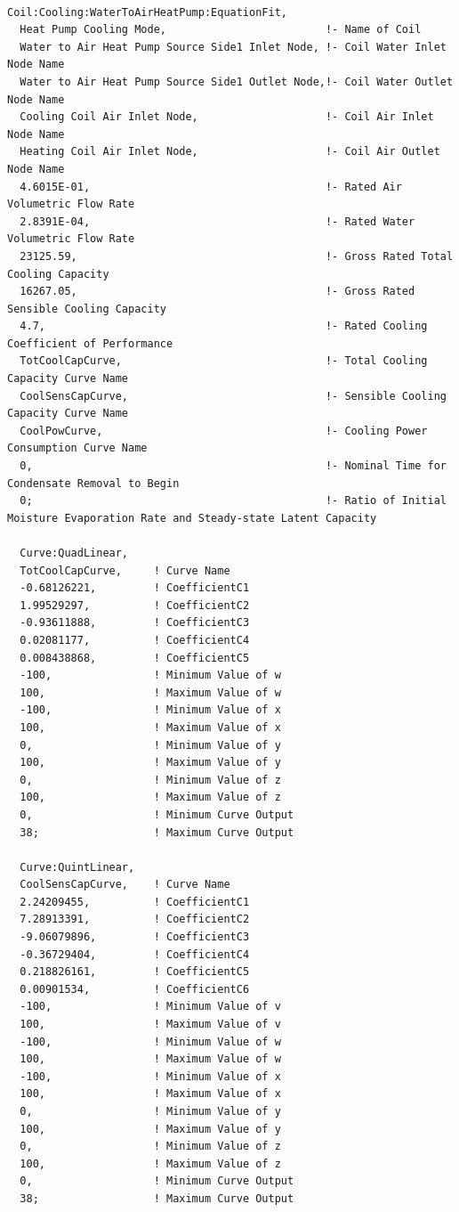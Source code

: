 \begin{lstlisting}

Coil:Cooling:WaterToAirHeatPump:EquationFit,
  Heat Pump Cooling Mode,                         !- Name of Coil
  Water to Air Heat Pump Source Side1 Inlet Node, !- Coil Water Inlet Node Name
  Water to Air Heat Pump Source Side1 Outlet Node,!- Coil Water Outlet Node Name
  Cooling Coil Air Inlet Node,                    !- Coil Air Inlet Node Name
  Heating Coil Air Inlet Node,                    !- Coil Air Outlet Node Name
  4.6015E-01,                                     !- Rated Air Volumetric Flow Rate
  2.8391E-04,                                     !- Rated Water Volumetric Flow Rate
  23125.59,                                       !- Gross Rated Total Cooling Capacity
  16267.05,                                       !- Gross Rated Sensible Cooling Capacity
  4.7,                                            !- Rated Cooling Coefficient of Performance
  TotCoolCapCurve,                                !- Total Cooling Capacity Curve Name
  CoolSensCapCurve,                               !- Sensible Cooling Capacity Curve Name
  CoolPowCurve,                                   !- Cooling Power Consumption Curve Name
  0,                                              !- Nominal Time for Condensate Removal to Begin
  0;                                              !- Ratio of Initial Moisture Evaporation Rate and Steady-state Latent Capacity
  
  Curve:QuadLinear,
  TotCoolCapCurve,     ! Curve Name
  -0.68126221,         ! CoefficientC1
  1.99529297,          ! CoefficientC2
  -0.93611888,         ! CoefficientC3
  0.02081177,          ! CoefficientC4
  0.008438868,         ! CoefficientC5
  -100,                ! Minimum Value of w
  100,                 ! Maximum Value of w
  -100,                ! Minimum Value of x
  100,                 ! Maximum Value of x
  0,                   ! Minimum Value of y
  100,                 ! Maximum Value of y
  0,                   ! Minimum Value of z
  100,                 ! Maximum Value of z
  0,                   ! Minimum Curve Output
  38;                  ! Maximum Curve Output

  Curve:QuintLinear,
  CoolSensCapCurve,    ! Curve Name
  2.24209455,          ! CoefficientC1
  7.28913391,          ! CoefficientC2
  -9.06079896,         ! CoefficientC3
  -0.36729404,         ! CoefficientC4
  0.218826161,         ! CoefficientC5
  0.00901534,          ! CoefficientC6
  -100,                ! Minimum Value of v
  100,                 ! Maximum Value of v
  -100,                ! Minimum Value of w
  100,                 ! Maximum Value of w
  -100,                ! Minimum Value of x
  100,                 ! Maximum Value of x
  0,                   ! Minimum Value of y
  100,                 ! Maximum Value of y
  0,                   ! Minimum Value of z
  100,                 ! Maximum Value of z
  0,                   ! Minimum Curve Output
  38;                  ! Maximum Curve Output


\end{lstlisting}
